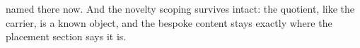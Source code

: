 named there now. And the novelty scoping survives intact: the quotient, like the carrier, is a known object, and the bespoke content stays exactly where the placement section says it is.
